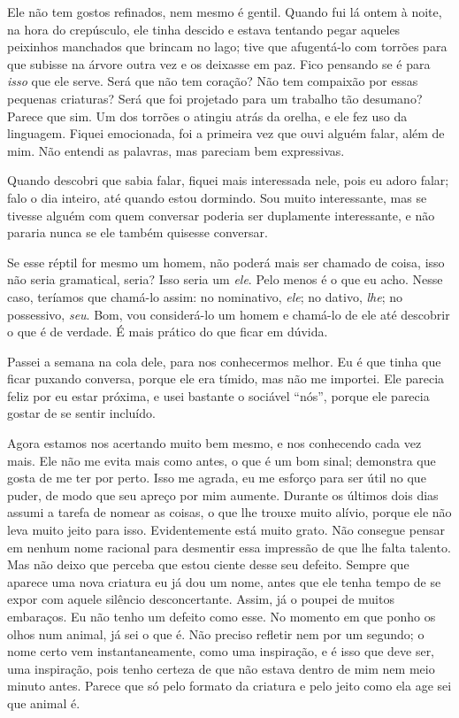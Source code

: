 Ele não tem gostos refinados, nem mesmo é gentil. Quando fui lá ontem à noite,
na hora do crepúsculo, ele tinha descido e estava tentando pegar aqueles
peixinhos manchados que brincam no lago; tive que afugentá-lo com torrões para
que subisse na árvore outra vez e os deixasse em paz. Fico pensando se é para \textit{isso} que
ele serve. Será que não tem coração? Não tem compaixão por essas pequenas
criaturas? Será que foi projetado para um trabalho tão desumano? Parece que
sim. Um dos torrões o atingiu atrás da orelha, e ele fez uso da linguagem.
Fiquei emocionada, foi a primeira vez que ouvi alguém falar, além de mim.
Não entendi as palavras, mas pareciam bem expressivas.

Quando descobri que sabia falar, fiquei mais interessada nele, pois eu adoro
falar; falo o dia inteiro, até quando estou dormindo. Sou muito interessante,
mas se tivesse alguém com quem conversar poderia ser duplamente interessante,
e não pararia nunca se ele também quisesse conversar.

Se esse réptil for mesmo um homem, não poderá mais ser chamado de coisa,
isso não seria gramatical, seria? Isso seria um \textit{ele}. Pelo menos é o que eu acho.
Nesse caso, teríamos que chamá-lo assim: no nominativo, \textit{ele}; no dativo, \textit{lhe}; no
possessivo, \textit{seu}. Bom, vou considerá-lo um homem e chamá-lo de ele até descobrir
o que é de verdade. É mais prático do que ficar em dúvida.

 Passei a semana na cola dele, para nos conhecermos
melhor. Eu é que tinha que ficar puxando conversa, porque ele era tímido, mas não
me importei. Ele parecia feliz por eu estar próxima, e usei bastante o sociável
“nós”, porque ele parecia gostar de se sentir incluído.

 Agora estamos nos acertando muito bem mesmo, e nos conhecendo
cada vez mais. Ele não me evita mais como antes, o que é um bom sinal;
demonstra que gosta de me ter por perto. Isso me agrada, eu me esforço para
ser útil no que puder, de modo que seu apreço por mim aumente. Durante os últimos dois
dias assumi a tarefa de nomear as coisas, o que lhe trouxe muito
alívio, porque ele não leva muito jeito para isso. Evidentemente está muito
grato. Não consegue pensar em nenhum nome racional para desmentir essa
impressão de que lhe falta talento. Mas não deixo que perceba que estou ciente
desse seu defeito. Sempre que aparece uma nova criatura eu já dou um nome,
antes que ele tenha tempo de se expor com aquele silêncio desconcertante. Assim,
já o poupei de muitos embaraços. Eu não tenho um defeito como esse.
No momento em que ponho os olhos num animal, já sei o que é. Não preciso
refletir nem por um segundo; o nome certo vem instantaneamente, como
uma inspiração, e é isso que deve ser, uma inspiração, pois tenho certeza de que
não estava dentro de mim nem meio minuto antes. Parece que só pelo formato da
criatura e pelo jeito como ela age sei que animal é.

